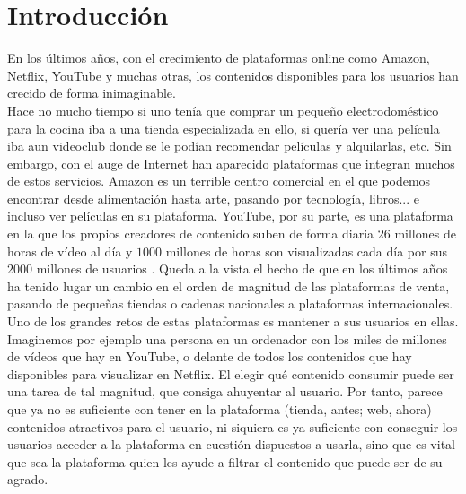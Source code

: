 \chapter{Introducción}\label{chap:introduccion}

En los últimos años, con el crecimiento de plataformas online como Amazon, Netflix, YouTube y muchas otras, los contenidos disponibles para los usuarios han crecido de forma inimaginable. \\

Hace no mucho tiempo si uno tenía que comprar un pequeño electrodoméstico para la cocina iba a una tienda especializada en ello, si quería ver una película iba aun videoclub donde se le podían recomendar películas y alquilarlas, etc. Sin embargo, con el auge de Internet han aparecido plataformas que integran muchos de estos servicios. Amazon es un terrible centro comercial en el que podemos encontrar desde alimentación hasta arte, pasando por tecnología, libros... e incluso ver películas en su plataforma. YouTube, por su parte, es una plataforma en la que los propios creadores de contenido suben de forma diaria $26$ millones de horas de vídeo al día y $1000$ millones de horas son visualizadas cada día por sus $2000$ millones de usuarios \cite{YoutubeStats}. Queda a la vista el hecho de que en los últimos años ha tenido lugar un cambio en el orden de magnitud de las plataformas de venta, pasando de pequeñas tiendas o cadenas nacionales a plataformas internacionales.\\

Uno de los grandes retos de estas plataformas es mantener a sus usuarios en ellas. Imaginemos por ejemplo una persona en un ordenador con los miles de millones de vídeos que hay en YouTube, o delante de todos los contenidos que hay disponibles para visualizar en Netflix. El elegir qué contenido consumir puede ser una tarea de tal magnitud, que consiga ahuyentar al usuario. Por tanto, parece que ya no es suficiente con tener en la plataforma (tienda, antes; web, ahora) contenidos atractivos para el usuario, ni siquiera es ya suficiente con conseguir los usuarios acceder a la plataforma en cuestión dispuestos a usarla, sino que es vital que sea la plataforma quien les ayude a filtrar el contenido que puede ser de su agrado.\\

